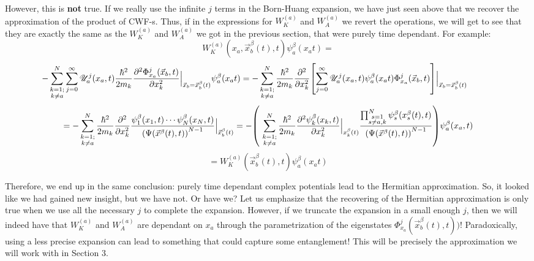 \documentclass[11pt, a4paper]{article} %
\newcommand{\s}{\mathbb{S}}
\newcommand{\U}{\mathscr{U}}
\begin{document}
However, this is {\bf not} true. If we really use the infinite $j$ terms in the Born-Huang expansion, we have just seen above that we recover the approximation of the product of CWF-s. Thus, if in the expressions for $W^{(a)}_K$ and $W^{(a)}_A$ we revert the operations, we will get to see that they are exactly the same as the $W^{(a)}_K$ and $W^{(a)}_A$ we got in the previous section, that were purely time dependant. For example:\vspace{+0.1cm}
$$
W_K^{(a)}(x_a, \vec{x}_b^\beta (t),t)\psi_a^\beta(x_a t)=
$$
$$
\hspace{-1.1cm}- \sum_{\substack{k=1; \\ k\neq a}}^{N} \sum_{j=0}^\infty \U^j_a(x_a,t) \frac{\hbar^2}{2m_k} \pdv[2]{ \Phi_{x_a}^j(\vec{x}_b,t)}{x_k}\Big\rvert_{\vec{x}_b=\vec{x}_b^\beta(t)} \psi_a^\beta(x_a t)=- \sum_{\substack{k=1; \\ k\neq a}}^{N}  \frac{\hbar^2}{2m_k} \pdv[2]{}{x_k}\qty[\sum_{j=0}^\infty  \U^j_a(x_a,t)\psi_a^\beta(x_a t) \Phi_{x_a}^j(\vec{x}_b,t)]\Big\rvert_{\vec{x}_b=\vec{x}_b^\beta(t)}
$$
$$
=- \sum_{\substack{k=1; \\ k\neq a}}^{N}  \frac{\hbar^2}{2m_k} \pdv[2]{}{x_k} \frac{\psi^\beta_1(x_1,t)\cdots \psi^\beta_N(x_N,t)}{\qty(\Psi(\vec{x}^\beta(t),t))^{N-1}} \Big\rvert_{\vec{x}_b^\beta(t)}=- \qty(\ \sum_{\substack{k=1; \\ k\neq a}}^{N} \frac{\hbar^2}{2m_k}\pdv[2]{\psi_k^\beta(x_k,t)}{x_k}\Big\rvert_{x_k^\beta(t)}\frac{\prod_{\substack{s=1\\s\neq a,k}}^{N} \psi_s^\beta(x_s^\beta(t),t) }{\qty(\Psi(\vec{x}^\beta(t),t))^{N-1}} )\psi_a^\beta(x_a,t) 
$$
$$
=W_K^{(a)}(\vec{x}_b^\beta (t),t)\psi_a^\beta(x_a t)
$$

Therefore, we end up in the same  conclusion: purely time dependant complex potentials lead to the Hermitian approximation. So, it looked like we had gained new insight, but we have not. Or have we? Let us emphasize that the recovering of the Hermitian approximation is only true when we use all the necessary $j$ to complete the expansion. However, if we truncate the expansion in a small enough $j$, then we will indeed have that $W^{(a)}_K$ and $W^{(a)}_A$ are dependant on $x_a$ through the parametrization of the eigenstates $\Phi_{x_a}^j(\vec{x}_b^\beta(t),t))$! Paradoxically, using a less precise expansion can lead to something that could capture some entanglement! This will be precisely the approximation we will work with in Section 3.
\end{document}
